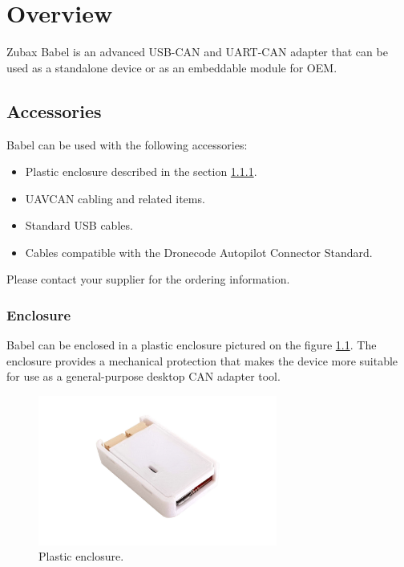 \documentclass{zubaxdoc}
\begin{document}
\tableofcontents
\BeginRightColumn
\listoffigures
\BeginRightColumn
\listoftables

\mainmatter

\chapter{Overview}

Zubax Babel is an advanced USB-CAN and UART-CAN adapter
that can be used as a standalone device or as an embeddable module for
OEM.

\section{Accessories}

Babel can be used with the following accessories:
\begin{itemize}
    \item Plastic enclosure described in the section \ref{sec:enclosure}.
    \item UAVCAN cabling and related items.
    \item Standard USB cables.
    \item Cables compatible with the Dronecode Autopilot Connector Standard.
\end{itemize}

Please contact your supplier for the ordering information.

\subsection{Enclosure}\label{sec:enclosure}

Babel can be enclosed in a plastic enclosure pictured on the figure \ref{fig:enclosure}.
The enclosure provides a mechanical protection that makes the device more suitable for use as a
general-purpose desktop CAN adapter tool.

\begin{figure}[hb]
    \centering
    \includegraphics[width=0.7\textwidth]{housing}
    \caption{Plastic enclosure.\label{fig:enclosure}}
\end{figure}
\end{document}
